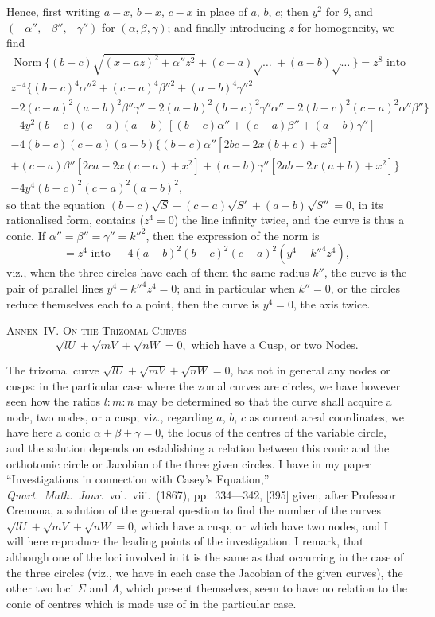 \documentclass[11pt,a4paper]{article}
\theoremstyle{plain}
\theoremstyle{definition}
\theoremstyle{remark}
\DeclareMathOperator{\Norm}{Norm}
\begin{document}
\newpage
\setcounter{page}{603}

Hence, first writing $a-x$, $b-x$, $c-x$ in place of $a$, $b$, $c$; then $y^2$ for $\theta$, and $(-\alpha'',-\beta'',-\gamma'')$ for $(\alpha,\beta,\gamma)$; and finally introducing $z$ for homogeneity, we find
\begin{multline*}
\Norm\{(b-c)\sqrt{(x-az)^2+\alpha''z^2}+(c-a)\sqrt{\ldots}+(a-b)\sqrt{\ldots}\}=z^8\text{ into}\\
z^{-4}\{(b-c)^4\alpha''^2+(c-a)^4\beta''^2+(a-b)^4\gamma''^2\\
-2(c-a)^2(a-b)^2\beta''\gamma''-2(a-b)^2(b-c)^2\gamma''\alpha''-2(b-c)^2(c-a)^2\alpha''\beta''\}\\
-4y^2(b-c)(c-a)(a-b)\,[(b-c)\alpha''+(c-a)\beta''+(a-b)\gamma'']\\
-4(b-c)(c-a)(a-b)\{(b-c)\alpha''[2bc-2x(b+c)+x^2]\\
+(c-a)\beta''[2ca-2x(c+a)+x^2]+(a-b)\gamma''[2ab-2x(a+b)+x^2]\}\\
-4y^4(b-c)^2(c-a)^2(a-b)^2,
\end{multline*}
so that the equation $(b-c)\sqrt{S}+(c-a)\sqrt{S'}+(a-b)\sqrt{S''}=0$, in its rationalised form, contains ($z^4=0$) the line infinity twice, and the curve is thus a conic. If $\alpha''=\beta''=\gamma''=k''^2$, then the expression of the norm is
\[
=z^4\text{ into }-4(a-b)^2(b-c)^2(c-a)^2(y^4-k''^4z^4),
\]
viz., when the three circles have each of them the same radius $k''$, the curve is the pair of parallel lines $y^4-k''^4z^4=0$; and in particular when $k''=0$, or the circles reduce themselves each to a point, then the curve is $y^4=0$, the axis twice.

\smallskip

\noindent\textsc{Annex~IV. On the Trizomal Curves}
\[
\sqrt{lU}+\sqrt{mV}+\sqrt{nW}=0,\text{ which have a Cusp, or two Nodes.}
\]

The trizomal curve $\sqrt{lU}+\sqrt{mV}+\sqrt{nW}=0$, has not in general any nodes or cusps: in the particular case where the zomal curves are circles, we have however seen how the ratios $l:m:n$ may be determined so that the curve shall acquire a node, two nodes, or a cusp; viz., regarding $a$, $b$, $c$ as current areal coordinates, we have here a conic $\alpha+\beta+\gamma=0$, the locus of the centres of the variable circle, and the solution depends on establishing a relation between this conic and the orthotomic circle or Jacobian of the three given circles. I have in my paper ``Investigations in connection with Casey's Equation,'' \textit{Quart.\ Math.\ Jour.}\ vol.~viii.\ (1867), pp.~334---342, [395] given, after Professor Cremona, a solution of the general question to find the number of the curves $\sqrt{lU}+\sqrt{mV}+\sqrt{nW}=0$, which have a cusp, or which have two nodes, and I will here reproduce the leading points of the investigation. I remark, that although one of the loci involved in it is the same as that occurring in the case of the three circles (viz., we have in each case the Jacobian of the given curves), the other two loci $\Sigma$ and $\Lambda$, which present themselves, seem to have no relation to the conic of centres which is made use of in the particular case.
\end{document}
